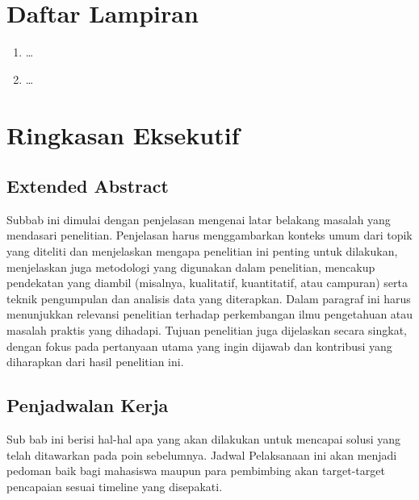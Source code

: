 \documentclass[a4paper,11pt,oneside]{report}
\begin{document}
\tableofcontents
\listoffigures
\listoftables

\chapter*{Daftar Lampiran}
\begin{enumerate}[label=Lampiran \arabic*.,leftmargin=*]
    \item \ldots
    \item \ldots
\end{enumerate}

\clearpage
{}
\setcounter{page}{1}
\chapter{Ringkasan Eksekutif}

\section{Extended Abstract}
Subbab ini dimulai dengan penjelasan mengenai latar belakang masalah yang
mendasari penelitian. Penjelasan harus menggambarkan konteks umum dari topik
yang diteliti dan menjelaskan mengapa penelitian ini penting untuk dilakukan,
menjelaskan juga metodologi yang digunakan dalam penelitian, mencakup pendekatan
yang diambil (misalnya, kualitatif, kuantitatif, atau campuran) serta teknik
pengumpulan dan analisis data yang diterapkan. Dalam paragraf ini harus
menunjukkan relevansi penelitian terhadap perkembangan ilmu pengetahuan atau
masalah praktis yang dihadapi. Tujuan penelitian juga dijelaskan secara singkat,
dengan fokus pada pertanyaan utama yang ingin dijawab dan kontribusi yang
diharapkan dari hasil penelitian ini.

\section{Penjadwalan Kerja}
Sub bab ini berisi hal-hal apa yang akan dilakukan untuk mencapai solusi yang
telah ditawarkan pada poin sebelumnya. Jadwal Pelaksanaan ini akan menjadi
pedoman baik bagi mahasiswa maupun para pembimbing akan target-target pencapaian
sesuai timeline yang disepakati.
\end{document}
